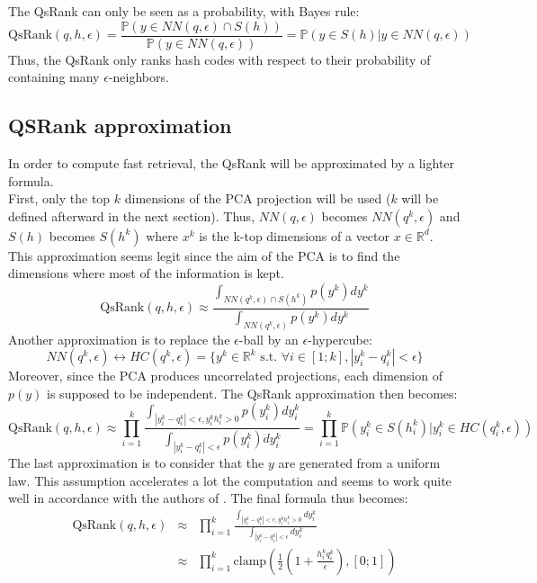 \documentclass{article}
\newcommand{\RR}{\mathbb{R}}
\newcommand{\qr}{\textrm{QsRank}}
\begin{document}
The QsRank can only be seen as a probability, with Bayes rule:
\[
	\qr(q, h, \epsilon) = \frac{\mathbb{P}(y\in NN(q,\epsilon) \cap S(h))}{\mathbb{P}(y\in NN(q,\epsilon))} = \mathbb{P}(y \in S(h) | y\in NN(q,\epsilon))
\]
Thus, the QsRank only ranks hash codes with respect to their probability of containing many $\epsilon$-neighbors.

\subsection{QSRank approximation}

In order to compute fast retrieval, the QsRank will be approximated by a lighter formula.\\
First, only the top $k$ dimensions of the PCA projection will be used ($k$ will be defined afterward in the next section). Thus, $NN(q,\epsilon)$ becomes $NN(q^k,\epsilon)$ and $S(h)$ becomes $S(h^k)$ where $x^k$ is the k-top dimensions of a vector $x \in \RR^d$. This approximation seems legit since the aim of the PCA is to find the dimensions where most of the information is kept.
\[
	\qr(q, h, \epsilon) \approx \frac{\int_{NN(q^k,\epsilon) \cap S(h^k)} p(y^k) dy^k}{\int_{NN(q^k,\epsilon)} p(y^k) dy^k}
\]
Another approximation is to replace the $\epsilon$-ball by an $\epsilon$-hypercube:
\[
	NN(q^k,\epsilon) \leftrightarrow HC(q^k,\epsilon) = \{y^k \in \RR^k \text{ s.t. } \forall i \in [1;k], |y^k_i-q^k_i|<\epsilon\}
\]
Moreover, since the PCA produces uncorrelated projections, each dimension of $p(y)$ is supposed to be independent. The QsRank approximation then becomes:
\[
	\qr(q, h, \epsilon) \approx \prod_{i=1}^k \frac{\int_{|y^k_i - q^k_i| < \epsilon, y^k_i h^k_i > 0 } p(y^k_i) dy^k_i}{\int_{|y^k_i - q^k_i| < \epsilon} p(y^k_i) dy^k_i} = \prod_{i=1}^k \mathbb{P}(y^k_i \in S(h^k_i) | y^k_i \in HC(q^k_i,\epsilon))
\]
The last approximation is to consider that the $y$ are generated from a uniform law. This assumption accelerates a lot the computation and seems to work quite well in accordance with the authors of \citep{QSRank}. The final formula thus becomes:
\begin{eqnarray*}
	\qr(q, h, \epsilon) 
	& \approx & \prod_{i=1}^k \frac{\int_{|y^k_i - q^k_i| < \epsilon, y^k_i h^k_i > 0 } dy^k_i}{\int_{|y^k_i - q^k_i| < \epsilon} dy^k_i} \\
	& \approx & \prod_{i=1}^k \text{clamp} \left(\frac{1}{2}\left( 1 + \frac{h^k_i q^k_i}{\epsilon} \right), [0;1] \right)                  
\end{eqnarray*}
\end{document}
